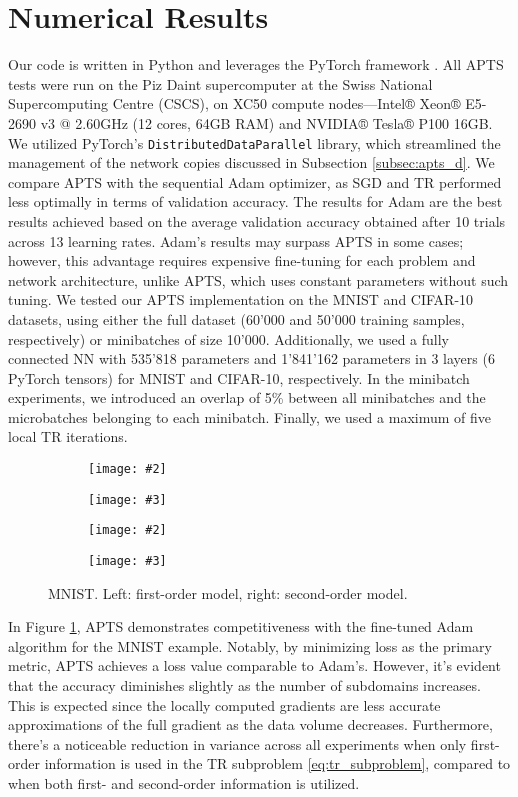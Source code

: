 \documentclass{article}
\newcommand{\customsubfigure}[3]{%
    \begin{subfigure}[b]{0.495\textwidth}
        \texttt{[image: \#2]}
    \end{subfigure}
    \begin{subfigure}[b]{0.495\textwidth}
        \texttt{[image: \#3]}
    \end{subfigure}
    \vspace{-1em}
    \caption*{#1}
}
\begin{document}
\section{Numerical Results}
Our code \cite{cruzas_ML_APTS} is written in Python and leverages the PyTorch framework \cite{paszke2019}. 
All APTS tests were run on the Piz Daint supercomputer at the Swiss National Supercomputing Centre (CSCS), on XC50 compute nodes---Intel® Xeon® E5-2690 v3 @ 2.60GHz (12 cores, 64GB RAM) and NVIDIA® Tesla® P100 16GB. 
We utilized PyTorch's \texttt{DistributedDataParallel} library, which streamlined the management of the network copies discussed in Subsection \ref{subsec:apts_d}. 
We compare APTS with the sequential Adam optimizer, as SGD and TR performed less optimally in terms of validation accuracy. 
The results for Adam are the best results achieved based on the average validation accuracy obtained after 10 trials across 13 learning rates. 
Adam's results may surpass APTS in some cases; however, this advantage requires expensive fine-tuning for each problem and network architecture, unlike APTS, which uses constant parameters without such tuning. 
We tested our APTS implementation on the MNIST and CIFAR-10 datasets, using either the full dataset (60'000 and 50'000 training samples, respectively) or minibatches of size 10'000. 
Additionally, we used a fully connected NN with 535'818 parameters and 1'841'162 parameters in 3 layers (6 PyTorch tensors) for MNIST and CIFAR-10, respectively. 
In the minibatch experiments, we introduced an overlap of 5\% between all minibatches and the microbatches belonging to each minibatch. 
Finally, we used a maximum of five local TR iterations.

\begin{figure}
    \centering
    \customsubfigure{}{./figures/APTS_D_ord1-MNIST-mbfull-overlap0_0-net1_accuracy_loss.png}{./figures/APTS_D_ord2-MNIST-mbfull-overlap0_0-net1_accuracy_loss.png}
    \vspace{-2em}
    \customsubfigure{}{./figures/APTS_D_ord1-MNIST-mb10000-overlap0_05-net1_accuracy_loss}{./figures/APTS_D_ord2-MNIST-mb10000-overlap0_05-net1_accuracy_loss.png}
    \vspace{-2em}
    \caption{MNIST. Left: first-order model, right: second-order model.}
    \label{fig:mnist_apts_d}
\end{figure}

\noindent In Figure \ref{fig:mnist_apts_d}, APTS demonstrates competitiveness with the fine-tuned Adam algorithm for the MNIST example. 
Notably, by minimizing loss as the primary metric, APTS achieves a loss value comparable to Adam's. 
However, it's evident that the accuracy diminishes slightly as the number of subdomains increases. 
This is expected since the locally computed gradients are less accurate approximations of the full gradient as the data volume decreases. 
Furthermore, there's a noticeable reduction in variance across all experiments when only first-order information is used in the TR subproblem \eqref{eq:tr_subproblem}, compared to when both first- and second-order information is utilized. 
\end{document}
